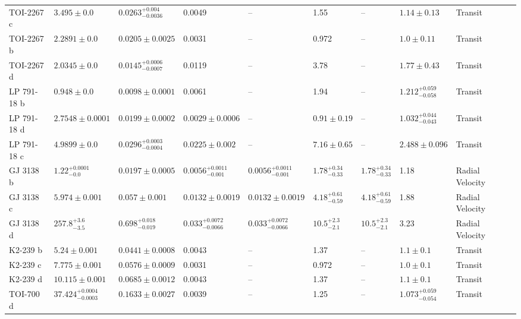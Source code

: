 \begin{tabular}{llllllllll}
TOI-2267 c & $3.495 \pm 0.0$ & $0.0263^{+0.004}_{-0.0036}$ & 0.0049 & -- & 1.55 & -- & $1.14 \pm 0.13$ & Transit & \cite{ZUNIGA_FERNANDEZ_ET_AL_2025} \\
TOI-2267 b & $2.2891 \pm 0.0$ & $0.0205 \pm 0.0025$ & 0.0031 & -- & 0.972 & -- & $1.0 \pm 0.11$ & Transit & \cite{ZUNIGA_FERNANDEZ_ET_AL_2025} \\
TOI-2267 d & $2.0345 \pm 0.0$ & $0.0145^{+0.0006}_{-0.0007}$ & 0.0119 & -- & 3.78 & -- & $1.77 \pm 0.43$ & Transit & \cite{GREKLEK_MCKEON_ET_AL_2026} \\
LP 791-18 b & $0.948 \pm 0.0$ & $0.0098 \pm 0.0001$ & 0.0061 & -- & 1.94 & -- & $1.212^{+0.059}_{-0.058}$ & Transit & \cite{PETERSON_ET_AL_2023} \\
LP 791-18 d & $2.7548 \pm 0.0001$ & $0.0199 \pm 0.0002$ & $0.0029 \pm 0.0006$ & -- & $0.91 \pm 0.19$ & -- & $1.032^{+0.044}_{-0.043}$ & Transit & \cite{GREKLEK_MCKEON_ET_AL_2025} \\
LP 791-18 c & $4.9899 \pm 0.0$ & $0.0296^{+0.0003}_{-0.0004}$ & $0.0225 \pm 0.002$ & -- & $7.16 \pm 0.65$ & -- & $2.488 \pm 0.096$ & Transit & \cite{GREKLEK_MCKEON_ET_AL_2025} \\
GJ 3138 b & $1.22^{+0.0001}_{-0.0}$ & $0.0197 \pm 0.0005$ & $0.0056^{+0.0011}_{-0.001}$ & $0.0056^{+0.0011}_{-0.001}$ & $1.78^{+0.34}_{-0.33}$ & $1.78^{+0.34}_{-0.33}$ & 1.18 & Radial Velocity & \cite{ASTUDILLO_DEFRU_ET_AL__2017} \\
GJ 3138 c & $5.974 \pm 0.001$ & $0.057 \pm 0.001$ & $0.0132 \pm 0.0019$ & $0.0132 \pm 0.0019$ & $4.18^{+0.61}_{-0.59}$ & $4.18^{+0.61}_{-0.59}$ & 1.88 & Radial Velocity & \cite{ASTUDILLO_DEFRU_ET_AL__2017} \\
GJ 3138 d & $257.8^{+3.6}_{-3.5}$ & $0.698^{+0.018}_{-0.019}$ & $0.033^{+0.0072}_{-0.0066}$ & $0.033^{+0.0072}_{-0.0066}$ & $10.5^{+2.3}_{-2.1}$ & $10.5^{+2.3}_{-2.1}$ & 3.23 & Radial Velocity & \cite{ASTUDILLO_DEFRU_ET_AL__2017} \\
K2-239 b & $5.24 \pm 0.001$ & $0.0441 \pm 0.0008$ & 0.0043 & -- & 1.37 & -- & $1.1 \pm 0.1$ & Transit & \cite{D_IACUTE_EZ_ALONSO_ET_AL__2018} \\
K2-239 c & $7.775 \pm 0.001$ & $0.0576 \pm 0.0009$ & 0.0031 & -- & 0.972 & -- & $1.0 \pm 0.1$ & Transit & \cite{D_IACUTE_EZ_ALONSO_ET_AL__2018} \\
K2-239 d & $10.115 \pm 0.001$ & $0.0685 \pm 0.0012$ & 0.0043 & -- & 1.37 & -- & $1.1 \pm 0.1$ & Transit & \cite{D_IACUTE_EZ_ALONSO_ET_AL__2018} \\
TOI-700 d & $37.424^{+0.0004}_{-0.0003}$ & $0.1633 \pm 0.0027$ & 0.0039 & -- & 1.25 & -- & $1.073^{+0.059}_{-0.054}$ & Transit & \cite{GILBERT_ET_AL_2023} \\

\end{tabular}
